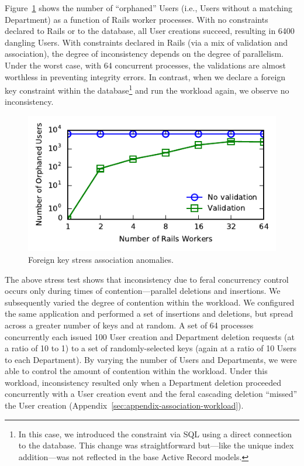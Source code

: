 Figure~\ref{fig:fk-stress} shows the number of ``orphaned'' Users
(i.e., Users without a matching Department) as a function of Rails
worker processes. With no constraints declared to Rails or to the
database, all User creations succeed, resulting in 6400 dangling
Users. With constraints declared in Rails (via a mix of validation and
association), the degree of inconsistency depends on the degree of
parallelism. Under the worst case, with 64 concurrent processes, the
validations are almost worthless in preventing integrity errors. In
contrast, when we declare a foreign key constraint within the
database\footnote{In this case, we introduced the constraint via SQL
  using a direct connection to the database. This change was
  straightforward but---like the unique index addition---was not
  reflected in the base Active Record models.}  and run the workload
again, we observe no inconsistency.

\begin{figure}
\includegraphics[width=\columnwidth]{figs/fk-stress-violations.pdf}\vspace{-1em}
\caption{Foreign key stress association anomalies.}
\label{fig:fk-stress}
\end{figure}

The above stress test shows that inconsistency due to feral
concurrency control occurs only during times of contention---parallel
deletions and insertions. We subsequently varied the degree of
contention within the workload. We configured the same application and
performed a set of insertions and deletions, but spread across a
greater number of keys and at random. A set of 64 processes
concurrently each issued 100 User creation and Department deletion
requests (at a ratio of 10 to 1) to a set of randomly-selected keys
(again at a ratio of 10 Users to each Department). By varying the
number of Users and Departments, we were able to control the amount of
contention within the workload. Under this workload, inconsistency
resulted only when a Department deletion proceeded concurrently with a
User creation event and the feral cascading deletion ``missed'' the
User creation (Appendix~\ref{sec:appendix-association-workload}).

